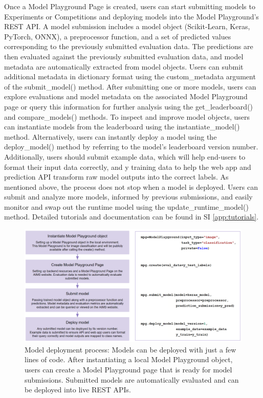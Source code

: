 Once a Model Playground Page is created, users can start submitting models to Experiments or Competitions and deploying models into the Model Playground’s REST API. A model submission includes a model object (Scikit-Learn, Keras, PyTorch, ONNX), a preprocessor function, and a set of predicted values corresponding to the previously submitted evaluation data. The predictions are then evaluated against the previously submitted evaluation data, and model metadata are automatically extracted from model objects. Users can submit additional metadata in dictionary format using the custom\_metadata argument of the submit\_model() method. After submitting one or more models, users can explore evaluations and model metadata on the associated Model Playground page or query this information for further analysis using the get\_leaderboard() and compare\_models() methods. To inspect and improve model objects, users can instantiate models from the leaderboard using the instantiate\_model() method. Alternatively, users can instantly deploy a model using the deploy\_model() method by referring to the model’s leaderboard version number. Additionally, users should submit example data, which will help end-users to format their input data correctly, and y training data to help the web app and prediction API transform raw model outputs into the correct labels. As mentioned above, the process does not stop when a model is deployed. Users can submit and analyze more models, informed by previous submissions, and easily monitor and swap out the runtime model using the update\_runtime\_model() method. Detailed tutorials and documentation can be found in SI \ref{app:tutorials}.

\begin{figure}
  \centering
  \includegraphics[width=1\textwidth]{figures/fig_aims_code_new.png}
  \caption{Model deployment process: Models can be deployed with just a few lines of code. After instantiating a local Model Playground object, users can create a Model Playground page that is ready for model submissions. Submitted models are automatically evaluated and can be deployed into live REST APIs.}
  \label{fig:fig_code_example}
\end{figure}

